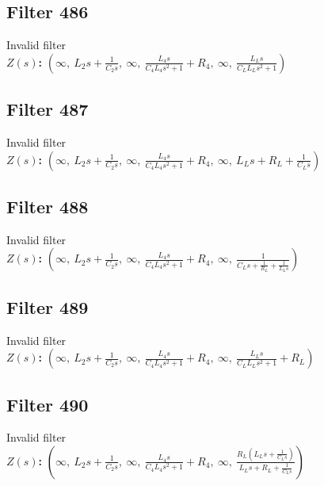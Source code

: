 \documentclass{article}
\begin{document}
\subsection*{Filter 486}
Invalid filter \\ 
\textbf{$Z(s)$:} $\left( \infty, \  L_{2} s + \frac{1}{C_{2} s}, \  \infty, \  \frac{L_{4} s}{C_{4} L_{4} s^{2} + 1} + R_{4}, \  \infty, \  \frac{L_{L} s}{C_{L} L_{L} s^{2} + 1}\right)$ \\ 
\subsection*{Filter 487}
Invalid filter \\ 
\textbf{$Z(s)$:} $\left( \infty, \  L_{2} s + \frac{1}{C_{2} s}, \  \infty, \  \frac{L_{4} s}{C_{4} L_{4} s^{2} + 1} + R_{4}, \  \infty, \  L_{L} s + R_{L} + \frac{1}{C_{L} s}\right)$ \\ 
\subsection*{Filter 488}
Invalid filter \\ 
\textbf{$Z(s)$:} $\left( \infty, \  L_{2} s + \frac{1}{C_{2} s}, \  \infty, \  \frac{L_{4} s}{C_{4} L_{4} s^{2} + 1} + R_{4}, \  \infty, \  \frac{1}{C_{L} s + \frac{1}{R_{L}} + \frac{1}{L_{L} s}}\right)$ \\ 
\subsection*{Filter 489}
Invalid filter \\ 
\textbf{$Z(s)$:} $\left( \infty, \  L_{2} s + \frac{1}{C_{2} s}, \  \infty, \  \frac{L_{4} s}{C_{4} L_{4} s^{2} + 1} + R_{4}, \  \infty, \  \frac{L_{L} s}{C_{L} L_{L} s^{2} + 1} + R_{L}\right)$ \\ 
\subsection*{Filter 490}
Invalid filter \\ 
\textbf{$Z(s)$:} $\left( \infty, \  L_{2} s + \frac{1}{C_{2} s}, \  \infty, \  \frac{L_{4} s}{C_{4} L_{4} s^{2} + 1} + R_{4}, \  \infty, \  \frac{R_{L} \left(L_{L} s + \frac{1}{C_{L} s}\right)}{L_{L} s + R_{L} + \frac{1}{C_{L} s}}\right)$ \\ 
\end{document}
